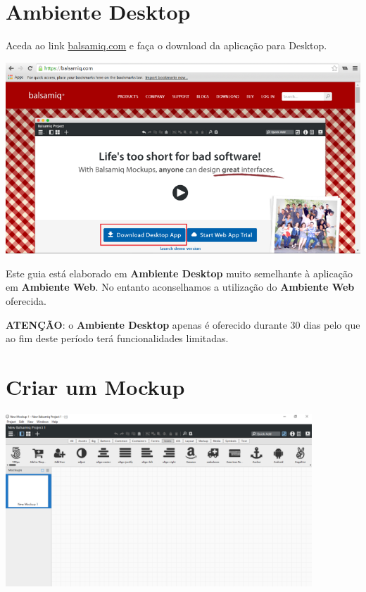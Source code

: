 \documentclass{tufte-book} %
\begin{document}
\let\cleardoublepage\clearpage

\chapter{Ambiente Desktop}

Aceda ao link \href{https://balsamiq.com/}{balsamiq.com} e faça o download da aplicação para Desktop.

\begin{center}
	\includegraphics{img2.png}
\end{center}

Este guia está elaborado em \textbf{Ambiente Desktop} muito semelhante à aplicação em \textbf{Ambiente Web}. No entanto aconselhamos a utilização do \textbf{Ambiente Web} oferecida.

\vspace{1.0cm}

\textbf{ATENÇÃO}: o \textbf{Ambiente Desktop} apenas é oferecido durante 30 dias pelo que ao fim deste período terá funcionalidades limitadas.

\chapter{Criar um Mockup}

\begin{center}
	\includegraphics[width=11.50cm]{img3.png}
\end{center}
\end{document}
